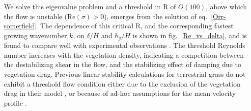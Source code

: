 \documentclass[aps,prl,twocolumn,superscriptaddress,10pt]{revtex4-1}  %
\newcommand{\hg}{h_g}
\newcommand{\Rey}{\text{R}}
\begin{document}
We solve this eigenvalue problem and a threshold in $\Rey$ of $O(100)$, above which the flow is unstable (Re$(\sigma)>0$), emerges from the 
solution of eq.~\eqref{Orr-somerfield}. The dependence of this critical $\Rey$, and the corresponding fastest growing wavenumber $k$, on $\delta/H$ and $\hg/H$ is shown 
in fig.~\ref{Re_vs_delta}, and is found to compare well with experimental observations \cite{Ghisal02}.
The threshold Reynolds number increases with the vegetation density, indicating a competition between the 
destabilizing shear in the flow, and the stabilizing effect of damping due to vegetation drag.
Previous linear stability calculations for terrestrial grass do not exhibit a threshold flow condition 
either due to the exclusion of the vegetation drag in their model \cite{Raupach96}, or because of ad-hoc
assumptions for the mean velocity profile \cite{Raupach96,Delangre06}.
\end{document}
